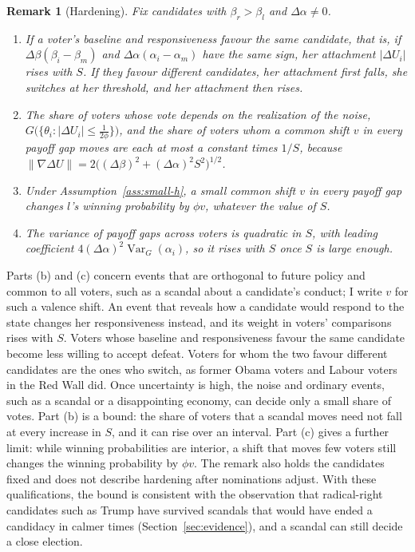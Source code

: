 \documentclass[12pt,letterpaper]{article}
\newtheorem{remark}{Remark}
\begin{document}
\begin{remark}[Hardening]\label{rem:hardening}
Fix candidates with $\beta_r>\beta_l$ and $\Delta\alpha\ne0$.
\begin{enumerate}
  \item[(a)] If a voter's baseline and responsiveness favour the same candidate, that is, if $\Delta\beta(\beta_i-\beta_m)$ and $\Delta\alpha(\alpha_i-\alpha_m)$ have the same sign, her attachment $|\Delta U_i|$ rises with $S$. If they favour different candidates, her attachment first falls, she switches at her threshold, and her attachment then rises.
  \item[(b)] The share of voters whose vote depends on the realization of the noise, $G\big(\{\theta_i:|\Delta U_i|\le\tfrac{1}{2\phi}\}\big)$, and the share of voters whom a common shift $v$ in every payoff gap moves are each at most a constant times $1/S$, because $\|\nabla\Delta U\|=2\big((\Delta\beta)^2+(\Delta\alpha)^2S^2\big)^{1/2}$.
  \item[(c)] Under Assumption~\ref{ass:small-h}, a small common shift $v$ in every payoff gap changes $l$'s winning probability by $\phi v$, whatever the value of $S$.
  \item[(d)] The variance of payoff gaps across voters is quadratic in $S$, with leading coefficient $4(\Delta\alpha)^2\operatorname{Var}_G(\alpha_i)$, so it rises with $S$ once $S$ is large enough.
\end{enumerate}
\end{remark}

Parts (b) and (c) concern events that are orthogonal to future policy and common to all voters, such as a scandal about a candidate's conduct; I write $v$ for such a valence shift. An event that reveals how a candidate would respond to the state changes her responsiveness instead, and its weight in voters' comparisons rises with $S$. Voters whose baseline and responsiveness favour the same candidate become less willing to accept defeat. Voters for whom the two favour different candidates are the ones who switch, as former Obama voters and Labour voters in the Red Wall did. Once uncertainty is high, the noise and ordinary events, such as a scandal or a disappointing economy, can decide only a small share of votes. Part (b) is a bound: the share of voters that a scandal moves need not fall at every increase in $S$, and it can rise over an interval. Part (c) gives a further limit: while winning probabilities are interior, a shift that moves few voters still changes the winning probability by $\phi v$. The remark also holds the candidates fixed and does not describe hardening after nominations adjust. With these qualifications, the bound is consistent with the observation that radical-right candidates such as Trump have survived scandals that would have ended a candidacy in calmer times (Section~\ref{sec:evidence}), and a scandal can still decide a close election.
\end{document}
